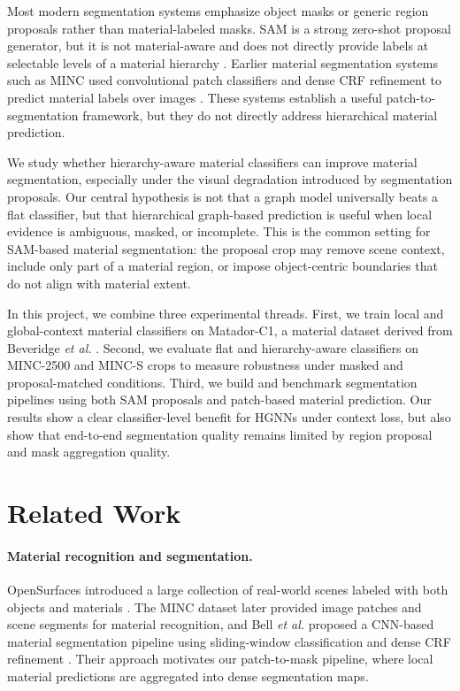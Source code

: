 \documentclass[11pt,twocolumn,letterpaper]{article}
\begin{document}
Most modern segmentation systems emphasize object masks or generic region proposals rather than material-labeled masks. SAM is a strong zero-shot proposal generator, but it is not material-aware and does not directly provide labels at selectable levels of a material hierarchy \cite{kirillov2023}. Earlier material segmentation systems such as MINC used convolutional patch classifiers and dense CRF refinement to predict material labels over images \cite{bell2015}. These systems establish a useful patch-to-segmentation framework, but they do not directly address hierarchical material prediction.

We study whether hierarchy-aware material classifiers can improve material segmentation, especially under the visual degradation introduced by segmentation proposals. Our central hypothesis is not that a graph model universally beats a flat classifier, but that hierarchical graph-based prediction is useful when local evidence is ambiguous, masked, or incomplete. This is the common setting for SAM-based material segmentation: the proposal crop may remove scene context, include only part of a material region, or impose object-centric boundaries that do not align with material extent.

In this project, we combine three experimental threads. First, we train local and global-context material classifiers on Matador-C1, a material dataset derived from Beveridge \textit{et al.} \cite{beveridge2025}. Second, we evaluate flat and hierarchy-aware classifiers on MINC-2500 and MINC-S crops to measure robustness under masked and proposal-matched conditions. Third, we build and benchmark segmentation pipelines using both SAM proposals and patch-based material prediction. Our results show a clear classifier-level benefit for HGNNs under context loss, but also show that end-to-end segmentation quality remains limited by region proposal and mask aggregation quality.

\section{Related Work}

\paragraph{Material recognition and segmentation.}
OpenSurfaces introduced a large collection of real-world scenes labeled with both objects and materials \cite{bell13opensurfaces}. The MINC dataset later provided image patches and scene segments for material recognition, and Bell \textit{et al.} proposed a CNN-based material segmentation pipeline using sliding-window classification and dense CRF refinement \cite{bell2015}. Their approach motivates our patch-to-mask pipeline, where local material predictions are aggregated into dense segmentation maps.
\end{document}
